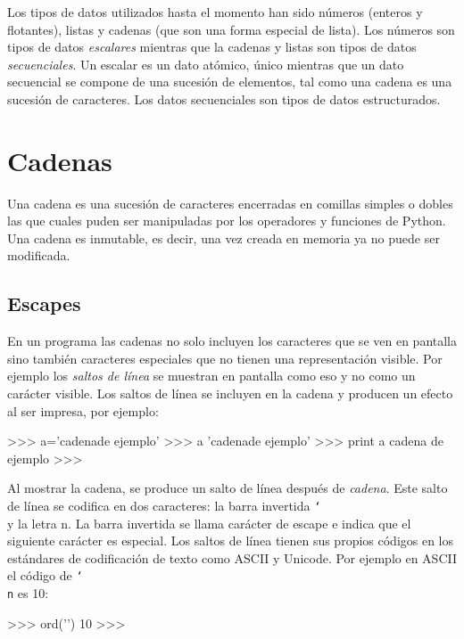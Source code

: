 Los tipos de datos utilizados hasta el momento han sido números (enteros y flotantes), listas y cadenas (que son una forma especial de lista). Los números son tipos de datos \textit{escalares} mientras que la cadenas y listas son tipos de datos \textit{secuenciales}. Un escalar es un dato atómico, único mientras que un dato secuencial se compone de una sucesión de elementos, tal como una cadena es una sucesión de caracteres. Los datos secuenciales son tipos de datos estructurados.

\section{Cadenas}

Una cadena es una sucesión de caracteres encerradas en comillas simples o dobles las que cuales puden ser manipuladas por los operadores y funciones de Python. Una cadena es inmutable, es decir, una vez creada en memoria ya no puede ser modificada.

\subsection{Escapes}

En un programa las cadenas no solo incluyen los caracteres que se ven en pantalla sino también caracteres especiales que no tienen una representación visible. Por ejemplo los \textit{saltos de línea} se muestran en pantalla como eso y no como un carácter visible. Los saltos de línea se incluyen en la cadena y producen un efecto al ser impresa, por ejemplo:\\

\begin{pyglist} [language=python]
>>> a='cadena\n de ejemplo'
>>> a
'cadena\n de ejemplo'
>>> print a
cadena
 de ejemplo
>>> 
\end{pyglist}

Al mostrar la cadena, se produce un salto de línea después de \textit{cadena}. Este salto de línea se codifica en dos caracteres: la barra invertida {\tt\char`\\} y la letra n. La barra invertida se llama carácter de escape e indica que el siguiente carácter es especial. Los saltos de línea tienen sus propios códigos en los estándares de codificación de texto como ASCII y Unicode. Por ejemplo en ASCII el código de {\tt\char`\\n} es 10:\\

\begin{pyglist} [language=python]
>>> ord('\n')
10
>>>
\end{pyglist}

